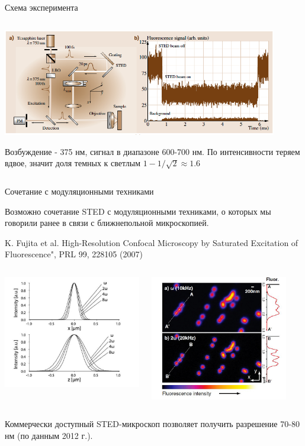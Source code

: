 \documentclass[9pt, compress, xcolor=table]{beamer}
\begin{document}
\begin{frame}{Схема эксперимента}
\begin{columns}[c]
\begin{center}
\begin{center}
\includegraphics[width=0.9\textwidth]{ffm03}
\end{center}
{\small Возбуждение - 375 нм, сигнал в диапазоне 600-700 нм. По интенсивности теряем вдвое, значит доля темных к светлым $1-1/\sqrt{2}\approx 1.6$ }
\end{center}

\end{columns}

\end{frame}

\begin{frame}{Сочетание с модуляционными техниками}

Возможно сочетание STED с модуляционными техниками, о которых мы говорили ранее в связи с ближнепольной микроскопией.

K. Fujita et al. High-Resolution Confocal Microscopy by Saturated Excitation of Fluorescence", PRL 99, 228105 (2007)
\begin{columns}[c] 
\column{6cm}
\begin{center}
\includegraphics[width=6cm]{fig4_07e}
\end{center}

\column{6cm}
\begin{center}
\includegraphics[width=6cm]{fig4_07c}
\end{center}
\end{columns}
Коммерчески доступный STED-микроскоп позволяет получить разрешение 70-80 нм (по данным 2012 г.).
\end{frame}
\end{document}
